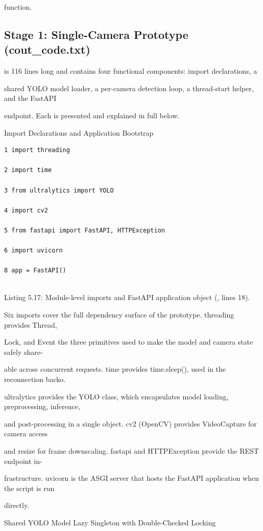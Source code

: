 function.


\subsection{Stage 1: Single-Camera Prototype (cout\_code.txt)}
is 116 lines long and contains four functional components: import declarations, a

shared YOLO model loader, a per-camera detection loop, a thread-start helper, and the FastAPI

endpoint. Each is presented and explained in full below.

Import Declarations and Application Bootstrap

\begin{listingbox}
	\begin{verbatim}
1 import threading

2 import time

3 from ultralytics import YOLO

4 import cv2

5 from fastapi import FastAPI, HTTPException

6 import uvicorn

8 app = FastAPI()


\end{verbatim}
\end{listingbox}
Listing 5.17: Module-level imports and FastAPI application object (, lines 18).

Six imports cover the full dependency surface of the prototype. threading provides Thread,

Lock, and Event  the three primitives used to make the model and camera state safely share-

able across concurrent requests. time provides time.sleep(), used in the reconnection backo.

ultralytics provides the YOLO class, which encapsulates model loading, preprocessing, inference,

and post-processing in a single object. cv2 (OpenCV) provides VideoCapture for camera access

and resize for frame downscaling. fastapi and HTTPException provide the REST endpoint in-

frastructure. uvicorn is the ASGI server that hosts the FastAPI application when the script is run

directly.

Shared YOLO Model  Lazy Singleton with Double-Checked Locking

